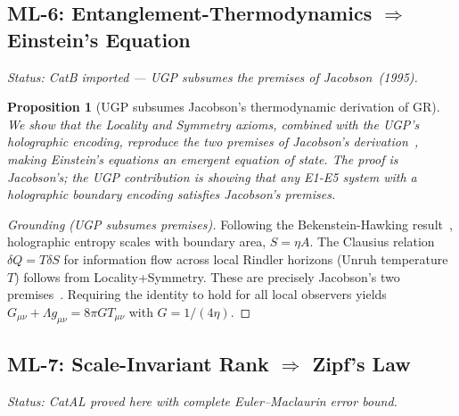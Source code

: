 \documentclass[11pt]{article}
\newtheorem{proposition}{Proposition}[section]
\begin{document}
\subsection{ML-6: Entanglement-Thermodynamics $\Rightarrow$ Einstein's Equation}
\emph{Status: CatB imported — UGP subsumes the premises of Jacobson~(1995).}

\begin{proposition}[UGP subsumes Jacobson's thermodynamic derivation of GR]
We show that the Locality and Symmetry axioms, combined with the UGP's holographic encoding, reproduce the two premises of Jacobson's derivation~\cite{Jacobson1995}, making Einstein's equations an emergent equation of state. The proof is Jacobson's; the UGP contribution is showing that any E1-E5 system with a holographic boundary encoding satisfies Jacobson's premises.
\end{proposition}
\begin{proof}[Grounding (UGP subsumes premises)]
Following the Bekenstein-Hawking result~\cite{Bekenstein1973}, holographic entropy scales with boundary area, $S = \eta A$. The Clausius relation $\delta Q = T\delta S$ for information flow across local Rindler horizons (Unruh temperature $T$) follows from Locality+Symmetry. These are precisely Jacobson's two premises~\cite{Jacobson1995}. Requiring the identity to hold for all local observers yields $G_{\mu\nu} + \Lambda g_{\mu\nu} = 8\pi G T_{\mu\nu}$ with $G = 1/(4\eta)$.
\end{proof}

\subsection{ML-7: Scale-Invariant Rank $\Rightarrow$ Zipf's Law}
\emph{Status: CatAL proved here with complete Euler--Maclaurin error bound.}
\end{document}
